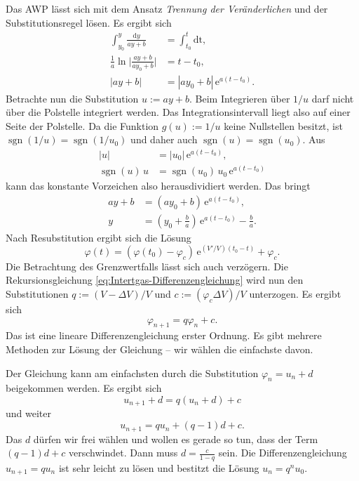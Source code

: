 \documentclass[a4paper,11pt,fleqn,twocolumn,twoside,dvipdfmx]{scrartcl}
\numberwithin{equation}{section}
\newcommand{\ee}{\mathrm e}
\newcommand{\sgn}{\operatorname{sgn}}
\begin{document}
Das AWP lässt sich mit dem Ansatz \emph{Trennung der Veränderlichen}
und der Substitutionsregel lösen. Es ergibt sich%
\begin{align}
\int_{y_0}^y \frac{\mathrm dy}{ay+b} &= \int_{t_0}^t\mathrm{dt},\\
\frac{1}{a}\ln\Big|\frac{ay+b}{ay_0+b}\Big| &= t-t_0,\\
|ay+b| &= |ay_0+b|\,\ee^{a(t-t_0)}.
\end{align}
Betrachte nun die Substitution $u:=ay+b$. Beim Integrieren über
$1/u$ darf nicht über die Polstelle integriert werden. Das
Integrationsintervall liegt also auf einer Seite der Polstelle.
Da die Funktion $g(u):=1/u$ keine Nullstellen besitzt, ist
$\sgn(1/u)=\sgn(1/u_0)$ und daher auch $\sgn(u)=\sgn(u_0)$. Aus
\begin{align}
|u| &= |u_0|\,\ee^{a(t-t_0)},\\
\sgn(u)\,u &= \sgn(u_0)\,u_0\,\ee^{a(t-t_0)}
\end{align}
kann das konstante Vorzeichen also herausdividiert werden.
Das bringt
\begin{align}
ay+b &= (ay_0+b)\,\ee^{a(t-t_0)},\\
y &= (y_0+\tfrac{b}{a})\,\ee^{a(t-t_0)}-\tfrac{b}{a}.
\end{align}
Nach Resubstitution ergibt sich die Lösung
\begin{equation}\label{eq:Volumenanteil-Dgl-Loesung}
\varphi(t) = (\varphi(t_0)-\varphi_c)\,\ee^{(V'/V)(t_0-t)}+\varphi_c.
\end{equation}
Die Betrachtung des Grenzwertfalls lässt sich auch verzögern.
Die Rekursionsgleichung \eqref{eq:Intertgas-Differenzengleichung}
wird nun den Substitutionen $q:=(V-\Delta V)/V$ und
$c:=(\varphi_c\Delta V)/V$ unterzogen. Es ergibt sich
\begin{equation}
\varphi_{n+1} = q\varphi_n+c.
\end{equation}
Das ist eine lineare Differenzengleichung erster Ordnung.
Es gibt mehrere Methoden zur Lösung der Gleichung -- wir wählen
die einfachste davon.

Der Gleichung kann am einfachsten durch die Substitution
$\varphi_n=u_n+d$ beigekommen werden. Es ergibt sich%
\begin{equation}
u_{n+1}+d = q(u_n+d)+c
\end{equation}
und weiter
\begin{equation}
u_{n+1} = qu_n+(q-1)d+c.
\end{equation}
Das $d$ dürfen wir frei wählen und wollen es gerade so tun,
dass der Term $(q-1)d+c$ verschwindet. Dann muss $d=\frac{c}{1-q}$
sein. Die Differenzengleichung $u_{n+1}=qu_n$ ist sehr leicht
zu lösen und bestitzt die Lösung $u_n = q^n u_0$.
\end{document}
